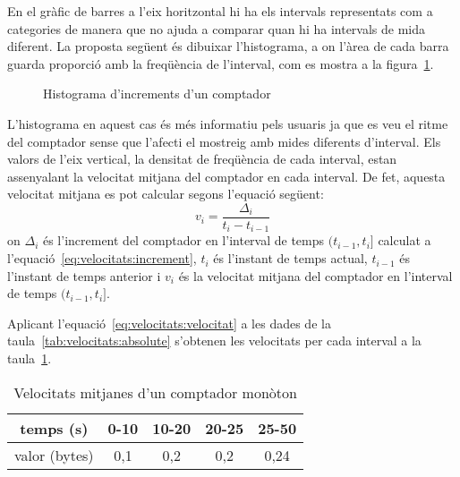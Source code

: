 En el gràfic de barres a l'eix horitzontal hi ha els intervals representats com a categories de manera que no ajuda a comparar quan hi ha intervals de mida diferent. La proposta següent és dibuixar l'histograma, a on l'àrea de cada barra guarda proporció amb la freqüència de l'interval, com es mostra a la figura~\ref{fig:velocitats:histograma}.

\begin{figure}[tbp]
  \centering
  \caption{Histograma d'increments d'un comptador}
  \label{fig:velocitats:histograma}
\end{figure}

L'histograma en aquest cas és més informatiu pels usuaris ja que es veu el ritme del comptador sense que l'afecti el mostreig  amb mides diferents d'interval.
Els valors de l'eix vertical, la densitat de freqüència de cada interval, estan assenyalant la velocitat mitjana del comptador en cada interval.  De fet, aquesta velocitat mitjana es pot calcular segons l'equació següent:
\begin{equation}\label{eq:velocitats:velocitat}
v_i = 
\frac{\Delta_i}{t_i - t_{i-1}}
\end{equation}
on $\Delta_i$ és l'increment del comptador en l'interval de temps $(t_{i-1},t_i]$  calculat a l'equació~\ref{eq:velocitats:increment}, $t_i$ és l'instant de temps actual, $t_{i-1}$ és l'instant de temps anterior i $v_i$ és la velocitat mitjana del comptador en l'interval de temps $(t_{i-1},t_i]$.

Aplicant l'equació~\ref{eq:velocitats:velocitat} a les dades de la taula~\ref{tab:velocitats:absolute} s'obtenen les velocitats per cada interval a la taula~\ref{tab:velocitats:velocitat}. 
\begin{table}[tbp]
\centering
\begin{tabular}{c|cccc}
  temps (s) & 0-10 & 10-20 & 20-25 & 25-50 \\ \hline
valor (bytes)& 0,1 & 0,2 & 0,2 & 0,24
\end{tabular}
\caption{Velocitats mitjanes d'un comptador monòton}
\label{tab:velocitats:velocitat}
\end{table}


